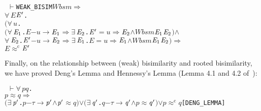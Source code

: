 \documentclass[GCNS]{yincog}
\renewcommand{\HOLConst}[1]{\texttt{#1}}
\renewcommand{\HOLBoundVar}[1]{\ensuremath{\mathit{#1}}}
\renewcommand{\HOLFreeVar}[1]{\ensuremath{\mathit{#1}}}
\renewcommand{\HOLSymConst}[1]{#1}
\renewcommand{\HOLTokenConj}{\ensuremath{\wedge}}
\renewcommand{\HOLTokenExists}{\ensuremath{\exists \,}}
\renewcommand{\HOLTokenForall}{\ensuremath{\forall \,}}
\renewcommand{\HOLTokenTurnstile}{\ensuremath{\:\:\vdash}}
\renewcommand{\HOLTokenDisj}{\ensuremath{\vee}}
\theoremstyle{remark}
\theoremstyle{theorem}
\theoremstyle{remark}
\newcommand{\HOLTokenWeakEQ}{$\approx$}
\newcommand{\HOLTokenObsCongr}{$\approx^{\mathrm{c}}\!$}
\newcommand{\HOLTokenTransBegin}{$-$}
\newcommand{\HOLTokenTransEnd}{$\rightarrow$\xspace}
\newcommand{\HOLTokenWeakTransBegin}{$=$}
\newcommand{\HOLTokenWeakTransEnd}{$\Rightarrow$\xspace}
\renewcommand{\HOLTokenImp}{\ensuremath{\Longrightarrow}}
\begin{document}
\begin{alltt}
\HOLTokenTurnstile{} \HOLConst{WEAK\_BISIM} \HOLFreeVar{Wbsm} \HOLSymConst{\HOLTokenImp{}}
   \HOLSymConst{\HOLTokenForall{}}\HOLBoundVar{E} \ensuremath{\HOLBoundVar{E}\sp{\prime}}.
       \ensuremath{(}\HOLSymConst{\HOLTokenForall{}}\HOLBoundVar{u}.
            \ensuremath{(}\HOLSymConst{\HOLTokenForall{}}\ensuremath{\HOLBoundVar{E}\sb{\mathrm{1}}}. \HOLBoundVar{E} \HOLTokenTransBegin\HOLBoundVar{u}\HOLTokenTransEnd \ensuremath{\HOLBoundVar{E}\sb{\mathrm{1}}} \HOLSymConst{\HOLTokenImp{}} \HOLSymConst{\HOLTokenExists{}}\ensuremath{\HOLBoundVar{E}\sb{\mathrm{2}}}. \ensuremath{\HOLBoundVar{E}\sp{\prime}} \HOLTokenWeakTransBegin\HOLBoundVar{u}\HOLTokenWeakTransEnd \ensuremath{\HOLBoundVar{E}\sb{\mathrm{2}}} \HOLSymConst{\HOLTokenConj{}} \HOLFreeVar{Wbsm} \ensuremath{\HOLBoundVar{E}\sb{\mathrm{1}}} \ensuremath{\HOLBoundVar{E}\sb{\mathrm{2}}}\ensuremath{)} \HOLSymConst{\HOLTokenConj{}}
            \HOLSymConst{\HOLTokenForall{}}\ensuremath{\HOLBoundVar{E}\sb{\mathrm{2}}}. \ensuremath{\HOLBoundVar{E}\sp{\prime}} \HOLTokenTransBegin\HOLBoundVar{u}\HOLTokenTransEnd \ensuremath{\HOLBoundVar{E}\sb{\mathrm{2}}} \HOLSymConst{\HOLTokenImp{}} \HOLSymConst{\HOLTokenExists{}}\ensuremath{\HOLBoundVar{E}\sb{\mathrm{1}}}. \HOLBoundVar{E} \HOLTokenWeakTransBegin\HOLBoundVar{u}\HOLTokenWeakTransEnd \ensuremath{\HOLBoundVar{E}\sb{\mathrm{1}}} \HOLSymConst{\HOLTokenConj{}} \HOLFreeVar{Wbsm} \ensuremath{\HOLBoundVar{E}\sb{\mathrm{1}}} \ensuremath{\HOLBoundVar{E}\sb{\mathrm{2}}}\ensuremath{)} \HOLSymConst{\HOLTokenImp{}}
       \HOLBoundVar{E} \HOLSymConst{\HOLTokenObsCongr} \ensuremath{\HOLBoundVar{E}\sp{\prime}}
\end{alltt}

Finally, on the relationship between (weak) bisimilarity and rooted bisimilarity,
we have proved Deng's Lemma and Hennessy's Lemma (Lemma 4.1 and 4.2 of~\citep[p.~176,~178]{Gorrieri:2015jt}):
%
\begin{alltt}
\HOLTokenTurnstile{} \HOLSymConst{\HOLTokenForall{}}\HOLBoundVar{p} \HOLBoundVar{q}.
       \HOLBoundVar{p} \HOLSymConst{\HOLTokenWeakEQ} \HOLBoundVar{q} \HOLSymConst{\HOLTokenImp{}}
       \ensuremath{(}\HOLSymConst{\HOLTokenExists{}}\ensuremath{\HOLBoundVar{p}\sp{\prime}}. \HOLBoundVar{p} \HOLTokenTransBegin\HOLSymConst{\ensuremath{\tau}}\HOLTokenTransEnd \ensuremath{\HOLBoundVar{p}\sp{\prime}} \HOLSymConst{\HOLTokenConj{}} \ensuremath{\HOLBoundVar{p}\sp{\prime}} \HOLSymConst{\HOLTokenWeakEQ} \HOLBoundVar{q}\ensuremath{)} \HOLSymConst{\HOLTokenDisj{}} \ensuremath{(}\HOLSymConst{\HOLTokenExists{}}\ensuremath{\HOLBoundVar{q}\sp{\prime}}. \HOLBoundVar{q} \HOLTokenTransBegin\HOLSymConst{\ensuremath{\tau}}\HOLTokenTransEnd \ensuremath{\HOLBoundVar{q}\sp{\prime}} \HOLSymConst{\HOLTokenConj{}} \HOLBoundVar{p} \HOLSymConst{\HOLTokenWeakEQ} \ensuremath{\HOLBoundVar{q}\sp{\prime}}\ensuremath{)} \HOLSymConst{\HOLTokenDisj{}} \HOLBoundVar{p} \HOLSymConst{\HOLTokenObsCongr} \HOLBoundVar{q}\hfill{[DENG\_LEMMA]}
\end{alltt}
\end{document}
